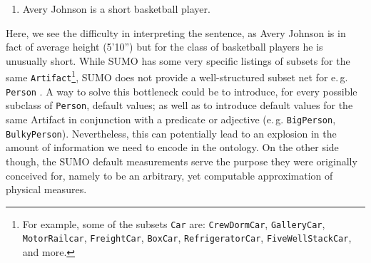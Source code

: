 \documentclass[11pt]{article}
\begin{document}
\begin{enumerate}
    \item Avery Johnson is a short basketball player. \label{ex:avery}
\end{enumerate}

Here, we see the difficulty in interpreting the sentence, as Avery Johnson is in fact of average height (5'10'') but
for the class of basketball players he is unusually short. While SUMO has some very specific listings of subsets for the same \texttt{Artifact}\footnote{For example, some of the subsets \texttt{Car} are: {\tt CrewDormCar}, {\tt GalleryCar}, {\tt MotorRailcar}, {\tt FreightCar}, {\tt BoxCar}, {\tt RefrigeratorCar}, {\tt FiveWellStackCar}, and more.}, %
SUMO does not provide a well-structured subset net for e.\,g. \texttt{Person}%
. A way to solve this bottleneck could be to introduce, for every possible subclass of {\tt Person}, default values; as well as to introduce default values for the same Artifact in conjunction with a predicate or adjective (e.\,g. {\tt BigPerson}, {\tt BulkyPerson}). Nevertheless, this can potentially lead to an explosion in the amount of information we need to encode in the ontology.
 On the other side though, the SUMO default measurements serve the purpose they were originally conceived for, namely to be an arbitrary, yet computable approximation of physical measures.
\end{document}
